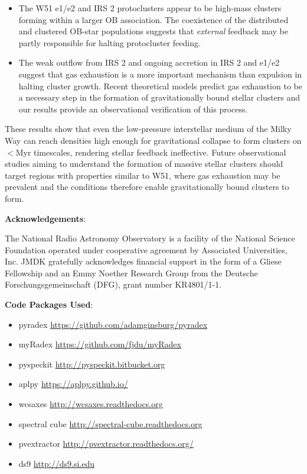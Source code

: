 \begin{itemize}
\item The W51 e1/e2 and IRS 2 protoclusters appear to be high-mass clusters
    forming within a larger OB association.  The coexistence of the distributed
    and clustered OB-star populations suggests that \emph{external} feedback
    may be partly responsible for halting protocluster feeding.

\item The weak outflow from IRS 2 and ongoing accretion in IRS 2 and e1/e2
    suggest that gas exhaustion is a more important mechanism than expulsion in
    halting cluster growth.
    Recent theoretical models predict gas exhaustion to be a necessary step in
    the formation of gravitationally bound stellar clusters
    \citep[e.g.][]{Kruijssen2012a} and our results provide an observational
    verification of this process.

\end{itemize}

These results show that even the low-pressure interstellar medium of the Milky
Way can reach densities high enough for gravitational collapse to form clusters
on $<$Myr timescales, rendering stellar feedback ineffective.  Future
observational studies aiming to understand the formation of massive stellar
clusters should target regions with properties similar to W51, where gas
exhaustion may be prevalent and the conditions therefore enable gravitationally
bound clusters to form.



\textbf{Acknowledgements}:

The National Radio Astronomy Observatory is a facility of the National Science
Foundation operated under cooperative agreement by Associated Universities,
Inc.
JMDK gratefully acknowledges financial support in the form of a Gliese
Fellowship and an Emmy Noether Research Group from the Deutsche
Forschungsgemeinschaft (DFG), grant number KR4801/1-1.



\textbf{Code Packages Used}:

\begin{itemize}
    \item pyradex \url{https://github.com/adamginsburg/pyradex}
    \item myRadex \url{https://github.com/fjdu/myRadex}
    \item pyspeckit \url{http://pyspeckit.bitbucket.org} \citet{Ginsburg2011c}
    \item aplpy \url{https://aplpy.github.io/}
    \item wcsaxes \url{http://wcsaxes.readthedocs.org}
    \item spectral cube \url{http://spectral-cube.readthedocs.org}
    \item pvextractor \url{http://pvextractor.readthedocs.org/}
    \item ds9 \url{http://ds9.si.edu}
\end{itemize}

